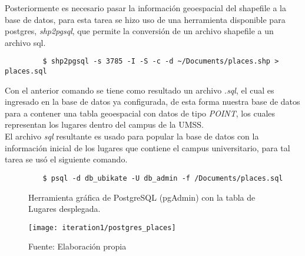        Posteriormente es necesario pasar la información geoespacial del shapefile a la base de datos, para esta tarea se hizo uso de una herramienta disponible para postgres, \emph{shp2pgsql}, que permite la conversión de un archivo shapefile a un archivo sql.

       \begin{verbatim}
         $ shp2pgsql -s 3785 -I -S -c -d ~/Documents/places.shp > places.sql
       \end{verbatim}

       Con el anterior comando se tiene como resultado un archivo \emph{.sql}, el cual es ingresado en la base de datos ya configurada, de esta forma nuestra base de datos para a contener una tabla geoespacial con datos de tipo \emph{POINT}, los cuales representan los lugares dentro del campus de la UMSS.\\


       El archivo \emph{sql} resultante es usado para popular la base de datos con la información inicial de los lugares que contiene el campus universitario, para tal tarea se usó el siguiente comando.\\

       \begin{verbatim}
         $ psql -d db_ubikate -U db_admin -f /Documents/places.sql
       \end{verbatim}

       \begin{figure}[H]
         \begin{center}
           \caption{Herramienta gráfica de PostgreSQL (pgAdmin) con la tabla de Lugares desplegada.}
           \label{fig:postgres_places}
           \texttt{[image: iteration1/postgres\_places]}
           \caption*{Fuente: Elaboración propia}
         \end{center}
       \end{figure}

